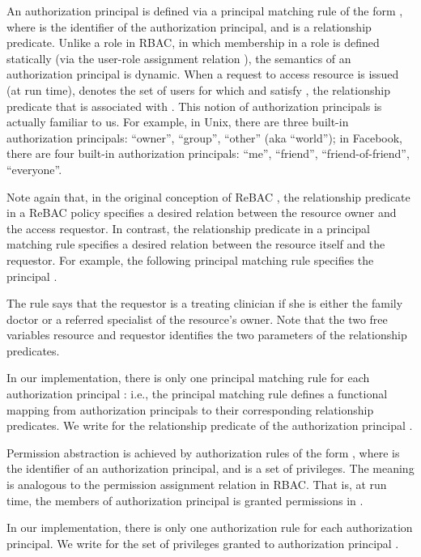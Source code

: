 \documentclass{acm_proc_article-sp}
\begin{document}
An authorization principal is defined via a principal matching rule of
the form , where  is the
identifier of the authorization principal, and  is a
relationship predicate.  Unlike a role in RBAC, in which membership in
a role is defined statically (via the user-role assignment relation
), the semantics of an authorization principal is
dynamic.  When a request to access resource  is issued (at run
time),  denotes the set of users  for which  and
 satisfy , the relationship predicate that is
associated with .  This notion of authorization
principals is actually familiar to us.  For example, in Unix, there
are three built-in authorization principals: ``owner'', ``group'',
``other'' (aka ``world''); in Facebook, there are four built-in
authorization principals: ``me'', ``friend'', ``friend-of-friend'',
``everyone''.

Note again that, in the original conception of ReBAC
\cite{Bruns-etal:2012}, the relationship predicate in a ReBAC policy
specifies a desired relation between the resource owner and the access
requestor.  In contrast, the relationship predicate in a principal
matching rule specifies a desired relation between the resource itself
and the requestor.  For example, the following principal matching
rule specifies the principal .

The rule says that the requestor is a treating clinician if she is
either the family doctor or a referred specialist of the resource's
owner.  Note that the two free variables \textsf{resource} and
\textsf{requestor} identifies the two parameters of the relationship
predicates.

In our implementation, there is only one principal matching rule for
each authorization principal : i.e., the principal
matching rule defines a functional mapping from authorization
principals to their corresponding relationship predicates.  We write
 for the relationship predicate of the
authorization principal .

Permission abstraction is achieved by authorization rules of the form
, where  is the identifier of an
authorization principal, and  is a set of privileges.  The meaning
is analogous to the permission assignment relation  in
RBAC.  That is, at run time, the members of authorization principal
 is granted permissions in .

In our implementation, there is only one authorization rule
for each authorization principal.  We write 
for the set of privileges granted to authorization principal
.
\end{document}
